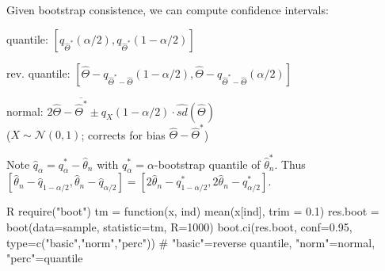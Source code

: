 \begin{sectionbox}\nospacing{}
  Given bootstrap consistence, we can compute confidence intervals: 
  \begin{enumeratenosep}[label=\roman*]
    \item quantile: $ [q_{\hat{\Theta}^{\ast}}(\alpha/2), q_{\hat{\Theta}^{\ast}}(1-\alpha/2)]  $
    \item rev. quantile: $ [\hat{\Theta} - q_{\hat{\Theta}^{\ast}-\hat{\Theta}}(1-\alpha/2), \hat{\Theta} - q_{\hat{\Theta}^{\ast}-\hat{\Theta}}(\alpha/2)]   $
    \item normal: $2\hat{\Theta}-\overline{\hat{\Theta}^*} \pm q_X(1-\alpha/2)\cdot \hat{sd}(\hat{\Theta})$ \\ ($X \sim \mathcal{N}(0,1)$; corrects for bias $\hat{\Theta} - \hat{\Theta}^{\ast}$) 
  \end{enumeratenosep}
  Note $\hat q_\alpha  = q_\alpha^\ast - \hat \theta_n$ with $q_\alpha^\ast = \alpha$-bootstrap quantile of $\hat\theta_n^\ast$.
  Thus $[\hat\theta_n -\hat q_{1-\alpha/2},\hat \theta_n - \hat q_{\alpha/2}] = [2\hat \theta_n - q_{1-\alpha/2}^\ast, 2\hat\theta_n-q_{\alpha/2}^\ast]$.
\end{sectionbox}
\begin{mintlinebox}{R}
  require("boot")
  tm = function(x, ind) {mean(x[ind], trim = 0.1)}
  res.boot = boot(data=sample, statistic=tm, R=1000)
  boot.ci(res.boot, conf=0.95, type=c("basic","norm","perc"))
  # "basic"=reverse quantile, "norm"=normal, "perc"=quantile
\end{mintlinebox}


